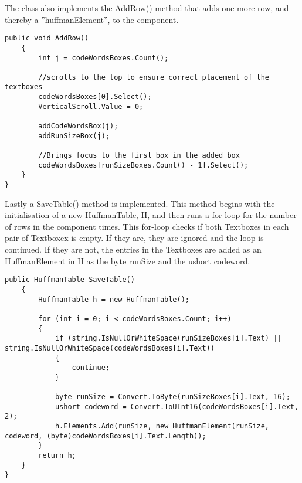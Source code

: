 The class also implements the AddRow() method that adds one more row, and thereby a ''huffmanElement'', to the component.


\begin{lstlisting}[firstnumber=136,label=JPEGEncode, caption={\lstinline|JPEGImage.Encode| method \textbf{File: }JPEGImage.cs}]
public void AddRow()
	{
		int j = codeWordsBoxes.Count();
		
		//scrolls to the top to ensure correct placement of the textboxes
		codeWordsBoxes[0].Select();
		VerticalScroll.Value = 0;
		
		addCodeWordsBox(j);
		addRunSizeBox(j);
		
		//Brings focus to the first box in the added box
		codeWordsBoxes[runSizeBoxes.Count() - 1].Select();
	}
}
\end{lstlisting}

Lastly a SaveTable() method is implemented. This method begins with the initialisation of a new HuffmanTable, H, and then runs a for-loop for the number of rows in the component times. This for-loop checks if both Textboxes in each pair of Textboxex is empty. If they are, they are ignored and the loop is continued. If they are not, the entries in the Textboxes are added as an HuffmanElement in H as the byte runSize and the ushort codeword. 

\begin{lstlisting}[firstnumber=136,label=JPEGEncode, caption={\lstinline|JPEGImage.Encode| method \textbf{File: }JPEGImage.cs}]
public HuffmanTable SaveTable()
	{
		HuffmanTable h = new HuffmanTable();
		
		for (int i = 0; i < codeWordsBoxes.Count; i++)
		{
			if (string.IsNullOrWhiteSpace(runSizeBoxes[i].Text) || string.IsNullOrWhiteSpace(codeWordsBoxes[i].Text))
			{
				continue;
			}
			
			byte runSize = Convert.ToByte(runSizeBoxes[i].Text, 16);
			ushort codeword = Convert.ToUInt16(codeWordsBoxes[i].Text, 2);
			h.Elements.Add(runSize, new HuffmanElement(runSize, codeword, (byte)codeWordsBoxes[i].Text.Length));
		}
		return h;
	}
}
\end{lstlisting}
